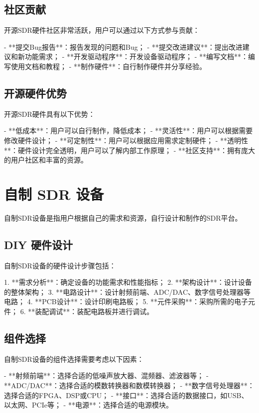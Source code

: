 ﻿\documentclass[UTF8]{ctexbook}
\begin{document}
\subsection{社区贡献}

开源SDR硬件社区非常活跃，用户可以通过以下方式参与贡献：

- **提交Bug报告**：报告发现的问题和Bug；
- **提交改进建议**：提出改进建议和新功能需求；
- **开发驱动程序**：开发设备驱动程序；
- **编写文档**：编写使用文档和教程；
- **制作硬件**：自行制作硬件并分享经验。

\subsection{开源硬件优势}

开源SDR硬件具有以下优势：

- **低成本**：用户可以自行制作，降低成本；
- **灵活性**：用户可以根据需要修改硬件设计；
- **可定制性**：用户可以根据应用需求定制硬件；
- **透明性**：硬件设计完全透明，用户可以了解内部工作原理；
- **社区支持**：拥有庞大的用户社区和丰富的资源。

\section{自制 SDR 设备}

自制SDR设备是指用户根据自己的需求和资源，自行设计和制作的SDR平台。

\subsection{DIY 硬件设计}

自制SDR设备的硬件设计步骤包括：

1. **需求分析**：确定设备的功能需求和性能指标；
2. **架构设计**：设计设备的整体架构；
3. **电路设计**：设计射频前端、ADC/DAC、数字信号处理器等电路；
4. **PCB设计**：设计印刷电路板；
5. **元件采购**：采购所需的电子元件；
6. **装配调试**：装配电路板并进行调试。

\subsection{组件选择}

自制SDR设备的组件选择需要考虑以下因素：

- **射频前端**：选择合适的低噪声放大器、混频器、滤波器等；
- **ADC/DAC**：选择合适的模数转换器和数模转换器；
- **数字信号处理器**：选择合适的FPGA、DSP或CPU；
- **接口**：选择合适的数据接口，如USB、以太网、PCIe等；
- **电源**：选择合适的电源模块。
\end{document}
